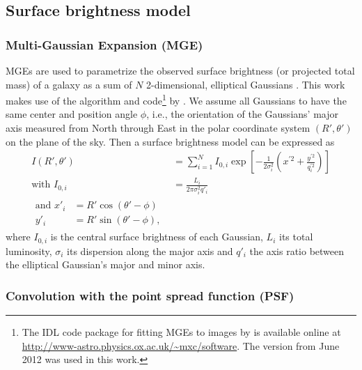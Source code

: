 \documentclass[useAMS,usenatbib]{mnras}
\begin{document}
\subsection{Surface brightness model} \label{sec:MGE_theo}

\subsubsection{Multi-Gaussian Expansion (MGE)}

MGEs are used to parametrize the observed surface brightness (or projected total mass) of a galaxy as a sum of $N$ 2-dimensional, elliptical Gaussians \citep{1991ApJ...366..599B,1992A&A...253..366M,1994A&A...285..723E,1999MNRAS.303..495E}. This work makes use of the algorithm and code\footnote{The IDL code package for fitting MGEs to images by \citet{Cap02} is available online at \url{http://www-astro.physics.ox.ac.uk/~mxc/software}. The version from June 2012 was used in this work.} by \citet{Cap02}. We assume all Gaussians to have the same center and position angle $\phi$, i.e., the orientation of the Gaussians' major axis measured from North through East in the polar coordinate system $(R',\theta')$ on the plane of the sky. Then a surface brightness model can be expressed as
\begin{align}
I(R',\theta') &= \sum_{i=1}^{N} I_{0,i} \exp\left[ - \frac{1}{2\sigma_i^2} \left(x^{'2} + \frac{y^{'2}}{q_i^{'2}}\right)\right]\label{eq:MGEgeneral}\\
\text{with } I_{0,i} &= \frac{L_i}{2\pi \sigma_i^2 q'_i}\label{eq:centralItotalL}\\
\begin{split}
\text{and } x'_i &= R' \cos(\theta' - \phi)\\
y'_i &= R' \sin(\theta' - \phi),
\end{split}
\end{align}
where $I_{0,i}$ is the central surface brightness of each Gaussian, $L_i$ its total luminosity, $\sigma_i$ its dispersion along the major axis and $q'_i$ the axis ratio between the elliptical Gaussian's major and minor axis.

\subsubsection{Convolution with the point spread function (PSF)}
\end{document}
